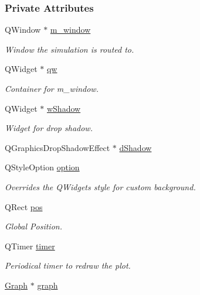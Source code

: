 \subsubsection*{Private Attributes}
\begin{DoxyCompactItemize}
\item 
Q\+Window $\ast$ \mbox{\hyperlink{classFluid_a138f09aa54f3209e67bf3e0a847bcdbc}{m\+\_\+window}}
\begin{DoxyCompactList}\small\item\em Window the simulation is routed to. \end{DoxyCompactList}\item 
Q\+Widget $\ast$ \mbox{\hyperlink{classFluid_a38ced692400072201566af41fd8fe5cd}{qw}}
\begin{DoxyCompactList}\small\item\em Container for m\+\_\+window. \end{DoxyCompactList}\item 
Q\+Widget $\ast$ \mbox{\hyperlink{classFluid_a55892004855abbf3458402a674add0e4}{w\+Shadow}}
\begin{DoxyCompactList}\small\item\em Widget for drop shadow. \end{DoxyCompactList}\item 
Q\+Graphics\+Drop\+Shadow\+Effect $\ast$ \mbox{\hyperlink{classFluid_a3e51c9ed538056955fd16efd6b8519a2}{d\+Shadow}}
\item 
Q\+Style\+Option \mbox{\hyperlink{classFluid_afcdad9ca2270eca892ebe19cc6eb0792}{option}}
\begin{DoxyCompactList}\small\item\em Overrides the Q\+Widget\textquotesingle{}s style for custom background. \end{DoxyCompactList}\item 
Q\+Rect \mbox{\hyperlink{classFluid_acc8b08224f3d6ee3a6d662c27562e1ab}{pos}}
\begin{DoxyCompactList}\small\item\em Global Position. \end{DoxyCompactList}\item 
Q\+Timer \mbox{\hyperlink{classFluid_a0765840a82e6ec401dea0cb65c435f5f}{timer}}
\begin{DoxyCompactList}\small\item\em Periodical timer to redraw the plot. \end{DoxyCompactList}\item 
\mbox{\hyperlink{classGraph}{Graph}} $\ast$ \mbox{\hyperlink{classFluid_a709eabc9846a8e29c79285c17b8b07ca}{graph}}

\end{DoxyCompactItemize}
